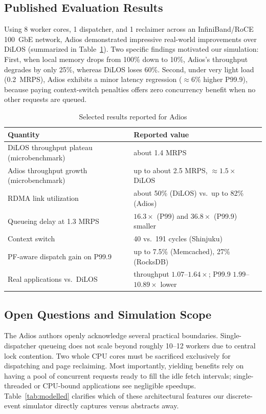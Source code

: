 \subsection{Published Evaluation Results}
Using 8 worker cores, 1 dispatcher, and 1 reclaimer across an InfiniBand/RoCE 100~GbE network, Adios demonstrated impressive real-world improvements over DiLOS (summarized in Table~\ref{tab:paper}). Two specific findings motivated our simulation: First, when local memory drops from 100\% down to 10\%, Adios's throughput degrades by only 25\%, whereas DiLOS loses 60\%. Second, under very light load (0.2~MRPS), Adios exhibits a minor latency regression ($\approx 6\%$ higher P99.9), because paying context-switch penalties offers zero concurrency benefit when no other requests are queued.

\begin{table}[t]
\caption{Selected results reported for Adios \cite{adios}}
\label{tab:paper}
\centering
\footnotesize
\begin{tabular}{p{3.9cm}p{3.2cm}}
\toprule
Quantity & Reported value \\
\midrule
DiLOS throughput plateau (microbenchmark) & about 1.4 MRPS \\
Adios throughput growth (microbenchmark) & up to about 2.5 MRPS, $\approx 1.5\times$ DiLOS \\
RDMA link utilization & about 50\% (DiLOS) vs.\ up to 82\% (Adios) \\
Queueing delay at 1.3 MRPS & $16.3\times$ (P99) and $36.8\times$ (P99.9) smaller \\
Context switch & 40 vs.\ 191 cycles (Shinjuku) \\
PF-aware dispatch gain on P99.9 & up to 7.5\% (Memcached), 27\% (RocksDB) \\
Real applications vs.\ DiLOS & throughput $1.07$--$1.64\times$; P99.9 $1.99$--$10.89\times$ lower \\
\bottomrule
\end{tabular}
\end{table}

\subsection{Open Questions and Simulation Scope}
The Adios authors openly acknowledge several practical boundaries. Single-dispatcher queueing does not scale beyond roughly 10--12 workers due to central lock contention. Two whole CPU cores must be sacrificed exclusively for dispatching and page reclaiming. Most importantly, yielding benefits rely on having a pool of concurrent requests ready to fill the idle fetch intervals; single-threaded or CPU-bound applications see negligible speedups. Table~\ref{tab:modelled} clarifies which of these architectural features our discrete-event simulator directly captures versus abstracts away.

